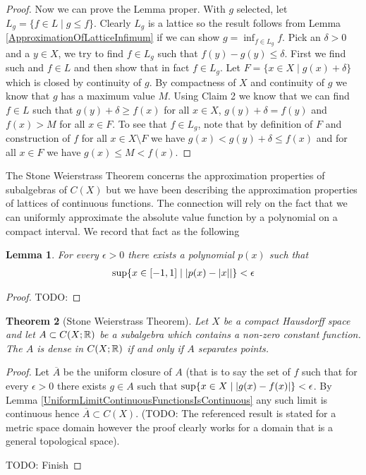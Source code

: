 \documentclass{amsart}
\newtheorem{thm}{Theorem}[section]
\newtheorem{lem}[thm]{Lemma}
\theoremstyle{remark}
\theoremstyle{definition}
\begin{document}
\begin{proof}
Now we can prove the Lemma proper.  With $g$ selected, let $L_g =
\lbrace f \in L \mid g \leq f \rbrace$.  Clearly $L_g$ is a lattice so
the result follows from Lemma \ref{ApproximationOfLatticeInfimum} if
we can show $g = \inf_{f \in L_g} f$.  Pick an $\delta > 0$ and a $y
\in X$, we try
to find $f \in L_g$ such that $f(y) - g(y) 
\leq \delta$.  First we find
such and $f \in L$ and then show that in fact $f \in L_g$.  Let $F =
\lbrace x\in X \mid g(x) + \delta \rbrace$ which is closed by
continuity of $g$.  By compactness of $X$ and continuity of $g$ we
know that $g$ has a maximum value $M$.  Using Claim 2 we know that we
can find $f \in L$ such that $g(y) +\delta \geq f(x)$ for all $x \in
X$, $g(y) + \delta = f(y)$ and $f(x) > M$ for all $x \in F$.  To see
that $f \in L_g$, note that by definition of $F$ and construction of $f$  for all $x \in X
\setminus F$ we have 
$g(x) < g(y) + \delta \leq f(x)$ and for all $x \in F$ we have $g(x)
\leq M < f(x)$.
\end{proof}

The Stone Weierstrass Theorem concerns the approximation properties of
subalgebras of $C(X)$ but we have been describing the approximation
properties of lattices of continuous functions.  The connection will
rely on the fact that we can uniformly approximate the absolute value
function by a polynomial on a compact interval.  We record that fact
as the following 
\begin{lem}For every $\epsilon > 0$ there exists a polynomial $p(x)$
  such that 
\begin{align*}
\sup \lbrace x \in [-1,1] \mid \left \vert p(x) - \left \vert x \right \vert \right \vert
  \rbrace < \epsilon
\end{align*}
\end{lem}
\begin{proof}
TODO:
\end{proof}

\begin{thm}[Stone Weierstrass Theorem]\label{StoneWeierstrassApproximation}Let $X$ be a compact Hausdorff space and let $A \subset
  C(X;\mathbb{R})$ be a subalgebra which contains a non-zero constant
  function.  The $A$ is dense in $C(X;\mathbb{R})$ if and only if $A$
  separates points.
\end{thm}
\begin{proof}
Let $\overline{A}$ be the uniform closure of $A$ (that is to say the
set of $f$ such that for every $\epsilon > 0$ there exists $g \in A$
such that $\sup \lbrace x \in X \mid \left \vert g(x) - f(x) \right \vert \rbrace <
\epsilon$.  By Lemma \ref{UniformLimitContinuousFunctionsIsContinuous}
any such limit is continuous hence $\overline{A} \subset C(X)$. (TODO: The referenced result is stated
for a metric space domain however the proof clearly works for a domain
that is a general topological space).

TODO: Finish
\end{proof}
\end{document}
